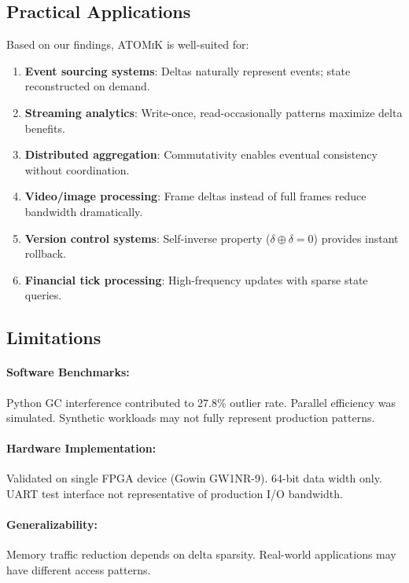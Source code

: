 \documentclass[11pt,letterpaper]{article}
\theoremstyle{plain}
\theoremstyle{definition}
\theoremstyle{remark}
\newcommand{\atomik}{\textsc{ATOMiK}}
\begin{document}
\subsection{Practical Applications}

Based on our findings, \atomik{} is well-suited for:

\begin{enumerate}
    \item \textbf{Event sourcing systems}: Deltas naturally represent events; state reconstructed on demand.
    
    \item \textbf{Streaming analytics}: Write-once, read-occasionally patterns maximize delta benefits.
    
    \item \textbf{Distributed aggregation}: Commutativity enables eventual consistency without coordination.
    
    \item \textbf{Video/image processing}: Frame deltas instead of full frames reduce bandwidth dramatically.
    
    \item \textbf{Version control systems}: Self-inverse property ($\delta \oplus \delta = 0$) provides instant rollback.
    
    \item \textbf{Financial tick processing}: High-frequency updates with sparse state queries.
\end{enumerate}

\subsection{Limitations}

\paragraph{Software Benchmarks:} Python GC interference contributed to 27.8\% outlier rate. Parallel efficiency was simulated. Synthetic workloads may not fully represent production patterns.

\paragraph{Hardware Implementation:} Validated on single FPGA device (Gowin GW1NR-9). 64-bit data width only. UART test interface not representative of production I/O bandwidth.

\paragraph{Generalizability:} Memory traffic reduction depends on delta sparsity. Real-world applications may have different access patterns.
\end{document}
